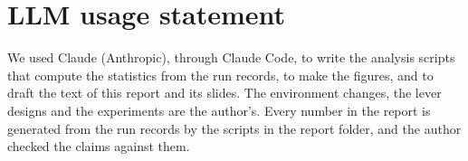 \documentclass{article}
\begin{document}
\section*{LLM usage statement}
We used Claude (Anthropic), through Claude Code, to write the analysis scripts that compute the statistics from the run records, to make the figures, and to draft the text of this report and its slides. The environment changes, the lever designs and the experiments are the author's. Every number in the report is generated from the run records by the scripts in the report folder, and the author checked the claims against them.
\end{document}
